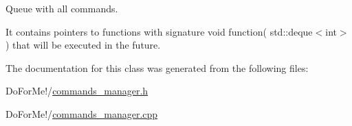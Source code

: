 Queue with all commands. 

It contains pointers to functions with signature void function( std\-::deque$<$int$>$ ) that will be executed in the future. 

The documentation for this class was generated from the following files\-:\begin{DoxyCompactItemize}
\item 
Do\-For\-Me!/\hyperlink{commands__manager_8h}{commands\-\_\-manager.\-h}\item 
Do\-For\-Me!/\hyperlink{commands__manager_8cpp}{commands\-\_\-manager.\-cpp}\end{DoxyCompactItemize}
